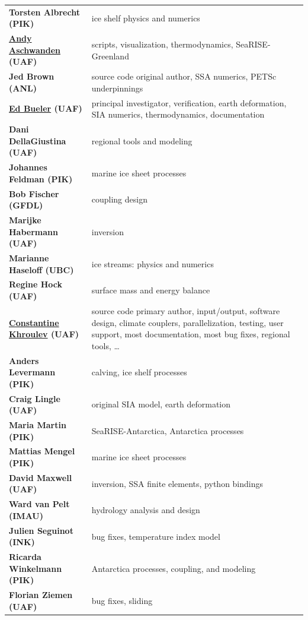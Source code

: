 \documentclass[titlepage,letterpaper,final]{scrartcl}
\begin{document}
\renewcommand{\arraystretch}{1.3}
\begin{tabular}{ll}
\textbf{Torsten Albrecht (PIK)} & ice shelf physics and numerics \\
\textbf{\underline{Andy Aschwanden} (UAF)} & \begin{minipage}[t]{4in} scripts, visualization, thermodynamics, SeaRISE-Greenland  \end{minipage}  \\
\textbf{Jed Brown (ANL)} & source code original author, SSA numerics, PETSc underpinnings \\
\textbf{\underline{Ed Bueler} (UAF)} & \begin{minipage}[t]{4in} principal investigator, verification, earth deformation, SIA numerics, thermodynamics, documentation  \end{minipage} \\
\textbf{Dani DellaGiustina (UAF)} & regional tools and modeling \\
\textbf{Johannes Feldman (PIK)} & marine ice sheet processes \\
\textbf{Bob Fischer (GFDL)} & coupling design \\
\textbf{Marijke Habermann (UAF)} & inversion\\
\textbf{Marianne Haseloff (UBC)} & ice streams: physics and numerics\\
\textbf{Regine Hock (UAF)} & surface mass and energy balance \\
\textbf{\underline{Constantine Khroulev} (UAF)} & \begin{minipage}[t]{4in} source code primary author, input/output, software design, climate couplers, parallelization, testing, user support, most documentation, most bug fixes, regional tools, \dots \end{minipage} \\
\textbf{Anders Levermann (PIK)} & calving, ice shelf processes \\
\textbf{Craig Lingle (UAF)} & original SIA model, earth deformation \\
\textbf{Maria Martin (PIK)} & SeaRISE-Antarctica, Antarctica processes \\
\textbf{Mattias Mengel (PIK)} & marine ice sheet processes \\
\textbf{David Maxwell (UAF)} & inversion, SSA finite elements, python bindings \\
\textbf{Ward van Pelt (IMAU)} & hydrology analysis and design \\
\textbf{Julien Seguinot (INK)} & bug fixes, temperature index model \\
\textbf{Ricarda Winkelmann (PIK)} & Antarctica processes, coupling, and modeling  \\
\textbf{Florian Ziemen (UAF)} & bug fixes, sliding \\
\end{tabular}
\end{document}
